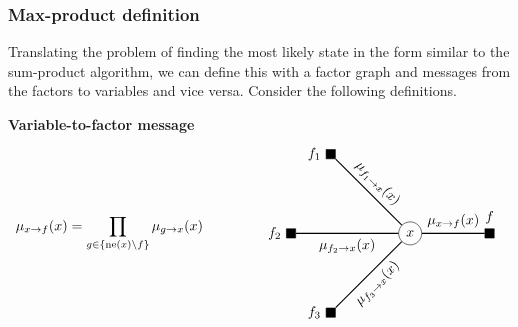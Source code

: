 \documentclass{article}
\begin{document}
\subsubsection{Max-product definition}

Translating the problem of finding the most likely state in the form similar to the sum-product algorithm, we can define this with a factor graph and messages from the factors to variables and vice versa. Consider the following definitions.
\\
\begin{theorem}
    \textbf{Variable-to-factor message} 
    \begin{equation*}
        \begin{aligned}
            \mu_{x \rightarrow f}(x) = \prod_{g \in \{\text{ne}(x)\text{\textbackslash}f\}} \mu_{g \rightarrow x}(x)
        \end{aligned}
        \qquad\qquad
        \vcenter{\hbox{
        \begin{tikzpicture}
            \node[circle, draw] at (0, 0)   (x) {$x$};
            \node[rectangle, draw, fill=black, label=left:{$f_1$}] at (-2, 2)   (f1) {};
            \node[rectangle, draw, fill=black, label=left:{$f_2$}] at (-3, 0)   (f2) {};
            \node[rectangle, draw, fill=black, label=left:{$f_3$}] at (-2, -2)   (f3) {};

            \node[rectangle, draw, fill=black, label=above:{$f$}] at (2, 0)   (f) {};
            
            \draw [thick] (f1) -- (x) node [midway,sloped, above, draw=none] {$\mu_{f_1 \rightarrow x}(x)$};
            \draw [thick] (f2) -- (x) node [midway,sloped, below, draw=none] {$\mu_{f_2 \rightarrow x}(x)$};
            \draw [thick] (f3) -- (x) node [midway,sloped, below, draw=none] {$\mu_{f_3 \rightarrow x}(x)$};
            \draw [thick] (x) -- (f) node [midway,sloped, above, draw=none] {$\mu_{x \rightarrow f}(x)$};
        \end{tikzpicture}
        }}
    \end{equation*}
\end{theorem}
\end{document}
